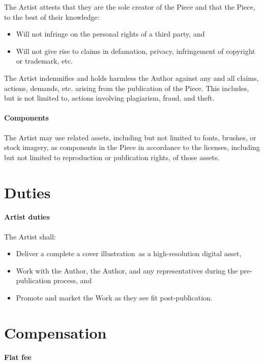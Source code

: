 \documentclass[12pt,letterpaper]{article}
\def\ArtType{a cover illustration}
\begin{document}
The Artist attests that they are the sole creator of the Piece and that the Piece, to the best of their knowledge:

\begin{itemize}
    \item Will not infringe on the personal rights of a third party, and
    \item Will not give rise to claims in defamation, privacy, infringement of copyright or trademark, etc.
\end{itemize}

The Artist indemnifies and holds harmless the Author against any and all claims, actions, demands, etc. arising from the publication of the Piece. This includes, but is not limited to, actions involving plagiarism, fraud, and theft.

\paragraph{Components}

The Artist may use related assets, including but not limited to fonts, brushes, or stock imagery, as components in the Piece in accordance to the licenses, including but not limited to reproduction or publication rights, of those assets.

\section{Duties}

\paragraph{Artist duties}

The Artist shall:

\begin{itemize}
    \item Deliver a complete \ArtType\ as a high-resolution digital asset,
    \item Work with the Author, the Author, and any representatives during the pre-publication process, and
    \item Promote and market the Work as they see fit post-publication.
\end{itemize}

\section{Compensation}

\paragraph{Flat fee}
\end{document}
